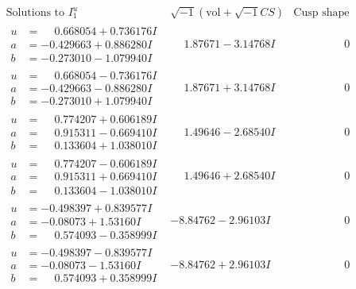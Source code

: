 \documentclass[1p]{elsarticle_modified}
\theoremstyle{definition}
\newcommand{\I}{\sqrt{-1}}
\begin{document}
$$\begin{array}{c|c|c}  
\text{Solutions to }I^u_{1}& \I (\text{vol} + \sqrt{-1}CS) & \text{Cusp shape}\\
 \hline 
\begin{aligned}
u &= \phantom{-}0.668054 + 0.736176 I \\
a &= -0.429663 + 0.886280 I \\
b &= -0.273010 - 1.079940 I\end{aligned}
 & \phantom{-}1.87671 - 3.14768 I & \phantom{-0.000000 } 0 \\ \hline\begin{aligned}
u &= \phantom{-}0.668054 - 0.736176 I \\
a &= -0.429663 - 0.886280 I \\
b &= -0.273010 + 1.079940 I\end{aligned}
 & \phantom{-}1.87671 + 3.14768 I & \phantom{-0.000000 } 0 \\ \hline\begin{aligned}
u &= \phantom{-}0.774207 + 0.606189 I \\
a &= \phantom{-}0.915311 - 0.669410 I \\
b &= \phantom{-}0.133604 + 1.038010 I\end{aligned}
 & \phantom{-}1.49646 - 2.68540 I & \phantom{-0.000000 } 0 \\ \hline\begin{aligned}
u &= \phantom{-}0.774207 - 0.606189 I \\
a &= \phantom{-}0.915311 + 0.669410 I \\
b &= \phantom{-}0.133604 - 1.038010 I\end{aligned}
 & \phantom{-}1.49646 + 2.68540 I & \phantom{-0.000000 } 0 \\ \hline\begin{aligned}
u &= -0.498397 + 0.839577 I \\
a &= -0.08073 + 1.53160 I \\
b &= \phantom{-}0.574093 - 0.358999 I\end{aligned}
 & -8.84762 - 2.96103 I & \phantom{-0.000000 } 0 \\ \hline\begin{aligned}
u &= -0.498397 - 0.839577 I \\
a &= -0.08073 - 1.53160 I \\
b &= \phantom{-}0.574093 + 0.358999 I\end{aligned}
 & -8.84762 + 2.96103 I & \phantom{-0.000000 } 0 \\ \hline\begin{aligned}

\end{aligned}
\end{array}$$
\end{document}
